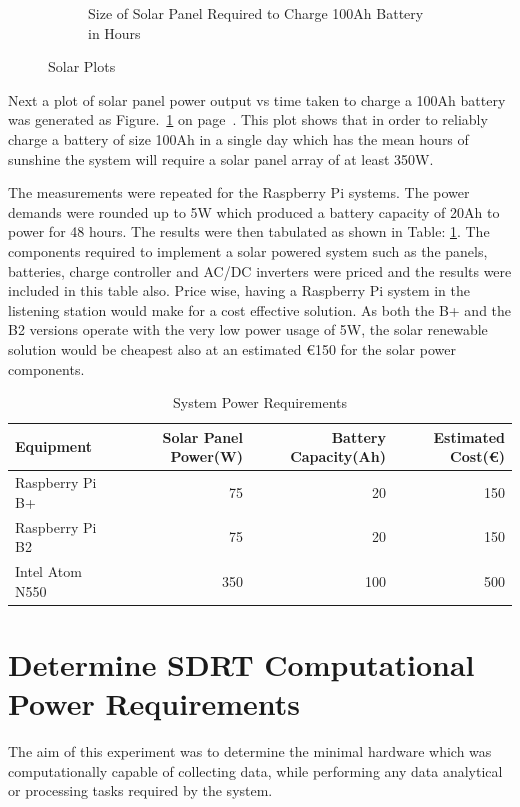 \begin{figure}
\begin{subfigure}[t]{5cm}
		\caption{Size of Solar Panel Required to Charge 100Ah Battery in Hours}
		\label{fig:lineplot_solar_panel_battery_capacity_hours}
	\end{subfigure}
	\caption{Solar Plots}
	\label{fig:solar_plots}
\end{figure}
%


Next a plot of solar panel power output vs time taken to charge a 100Ah battery was generated as Figure.~\ref{fig:lineplot_solar_panel_battery_capacity_hours} on page~\pageref{fig:lineplot_solar_panel_battery_capacity_hours}. This plot shows that in order to reliably charge a battery of size 100Ah in a single day which has the mean hours of sunshine the system will require a solar panel array of at least 350W.

The measurements were repeated for the Raspberry Pi systems. The power demands were rounded up to 5W which produced a battery capacity of 20Ah to power for 48 hours. The results were then tabulated as shown in Table: \ref{tab:system_power_requirements}. The components required to implement a solar powered system such as the panels, batteries, charge controller and AC/DC inverters were priced and the results were included in this table also. Price wise, having a Raspberry Pi system in the listening station would make for a cost effective solution. As both the B+ and the B2 versions operate with the very low power usage of 5W, the solar renewable solution would be cheapest also at an estimated \euro 150 for the solar power components.

%
\begin{table}
	\centering
	\begin{tabular}{l r r r}
		\toprule
		Equipment & Solar Panel Power(W) & Battery Capacity(Ah) & Estimated Cost(\euro)\\ \midrule
		Raspberry Pi B+ & 75 & 20 & 150 \\
		Raspberry Pi B2 & 75 & 20 & 150 \\
		Intel Atom N550 & 350 & 100 & 500 \\
		\bottomrule
	\end{tabular}
	\caption{System Power Requirements}
	\label{tab:system_power_requirements}
\end{table}
%


\section*{Determine SDRT Computational Power Requirements}
The aim of this experiment was to determine the minimal hardware which was computationally capable of collecting data, while  performing any data analytical or processing tasks required by the system.


